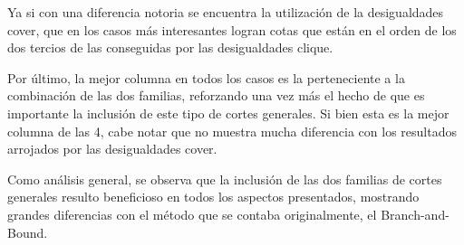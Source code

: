 Ya si con una diferencia notoria se encuentra la utilizaci\'on de la desigualdades cover, que en los casos m\'as interesantes logran cotas que est\'an en el orden de los dos tercios de las conseguidas por las desigualdades clique.

Por \'ultimo, la mejor columna en todos los casos es la perteneciente a la combinaci\'on de las dos familias, reforzando una vez m\'as el hecho de que es importante la inclusi\'on de este tipo de cortes generales. Si bien esta es la mejor columna de las 4, cabe notar que no muestra mucha diferencia con los resultados arrojados por las desigualdades cover.


\bigskip


Como an\'alisis general, se observa que la inclusi\'on de las dos familias de cortes generales resulto beneficioso en todos los aspectos presentados, mostrando grandes diferencias con el m\'etodo que se contaba originalmente, el Branch-and-Bound.